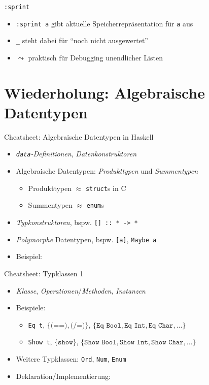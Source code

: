 \documentclass{beamer}
\begin{document}
\begin{frame}{\texttt{:sprint}}

	\begin{itemize}
		\item \texttt{:sprint a} gibt aktuelle Speicherrepräsentation für \texttt{a} aus
		\item \texttt{\_} steht dabei für \enquote{noch nicht ausgewertet}
		\item $\leadsto$ praktisch für Debugging unendlicher Listen
	\end{itemize}
\end{frame}

\section{Wiederholung: Algebraische Datentypen}

\begin{frame}{Cheatsheet: Algebraische Datentypen in Haskell}
  \begin{itemize}
    \item \emph{\texttt{data}-Definitionen}, \emph{Datenkonstruktoren}
    \item Algebraische Datentypen: \emph{Produkttypen} und \emph{Summentypen}
    \begin{itemize}
      \item Produkttypen $\approx$ \texttt{struct}s in C
      \item Summentypen $\approx$ \texttt{enum}s
    \end{itemize}
    \item \emph{Typkonstruktoren}, bspw. \texttt{[] :: * -> *}
    \item \emph{Polymorphe} Datentypen, bspw. \texttt{[a]}, \texttt{Maybe a}
    \item Beispiel:
  \end{itemize}
\end{frame}

\begin{frame}{Cheatsheet: Typklassen 1}
  \begin{itemize}
    \item \emph{Klasse}, \emph{Operationen}/\emph{Methoden}, \emph{Instanzen}
    \item Beispiele:
    \begin{itemize}
      \item \texttt{Eq t}, $\{ \texttt{(==)}, \texttt{(/=)} \}$, $\{ \texttt{Eq Bool}, \texttt{Eq Int}, \texttt{Eq Char}, ... \}$
      \item \texttt{Show t}, $\{ \texttt{show} \}$, $\{ \texttt{Show Bool}, \texttt{Show Int}, \texttt{Show Char}, ... \}$
    \end{itemize}
    \item Weitere Typklassen: \texttt{Ord}, \texttt{Num}, \texttt{Enum}
    \item Deklaration/Implementierung:
  \end{itemize}

\end{frame}
\end{document}
